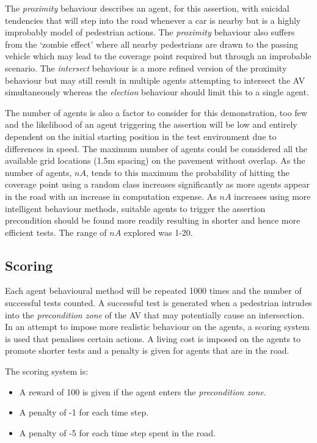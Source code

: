 \documentclass[letterpaper, 10 pt, journal, twoside]{IEEEtran}
\begin{document}
The \textit{proximity} behaviour describes an agent, for this assertion, with suicidal tendencies that will step into the road whenever a car is nearby but is a highly improbably model of pedestrian actions. The \textit{proximity} behaviour also suffers from the `zombie effect' where all nearby pedestrians are drawn to the passing vehicle which may lead to the coverage point required but through an improbable scenario. The \textit{intersect} behaviour is a more refined version of the proximity behaviour but may still result in multiple agents attempting to intersect the AV simultaneously whereas the \textit{election} behaviour should limit this to a single agent.

The number of agents is also a factor to consider for this demonstration, too few and the likelihood of an agent triggering the assertion will be low and entirely dependent on the initial starting position in the test environment due to differences in speed. The maximum number of agents could be considered all the available grid locations (1.5m spacing) on the pavement without overlap.
As the number of agents, $nA$, tends to this maximum the probability of hitting the coverage point using a random class increases significantly as more agents appear in the road with an increase in computation expense. As $nA$ increases using more intelligent behaviour methods, suitable agents to trigger the assertion precondition should be found more readily resulting in shorter and hence more efficient tests. The range of $nA$ explored was 1-20.





\subsection{Scoring}
Each agent behavioural method will be repeated 1000 times and the number of successful tests counted. A successful test is generated when a pedestrian intrudes into the \textit{precondition zone} of the AV that may potentially cause an intersection. %
In an attempt to impose more realistic behaviour on the agents, a scoring system is used that penalises certain actions. A living cost is imposed on the agents to promote shorter tests and a penalty is given for agents that are in the road.

The scoring system is:
\begin{itemize}
  \item A reward of 100 is given if the agent enters the \textit{precondition zone}.
  \item A penalty of -1 for each time step.
  \item A penalty of -5 for each time step spent in the road.
\end{itemize}
\end{document}
